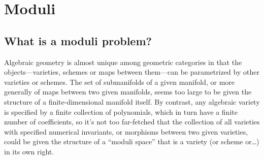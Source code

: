 

\chapter{Moduli} 
\label{Moduli chapter}\label{ModuliChapter}


\section{What is a moduli problem?}

Algebraic geometry is almost unique among geometric categories in that the objects---varieties,  schemes or maps between them---can be parametrized by other varieties or schemes. The set of submanifolds of a given manifold, or more generally of maps between two given manifolds, seems too large to be given the structure of a finite-dimensional manifold itself. By contrast, any algebraic variety is specified by a finite collection of polynomials, which in turn have a finite number of coefficients, so it's not too far-fetched that the collection of all varieties with specified numerical invariants, or morphisms between two given varieties, could be given the structure of a ``moduli space'' that is a variety (or scheme or\dots) in its own right.

